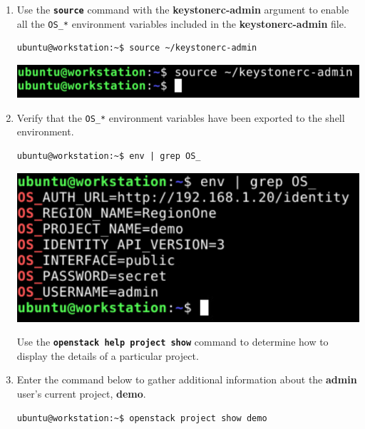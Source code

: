\documentclass[letterpaper, 12pt]{article}
\begin{document}
\begin{enumerate}
    \item Use the \textbf{\texttt{source}} command with the \textbf{keystonerc-admin} argument to enable all the
    \texttt{OS\_*} environment variables included in the \textbf{keystonerc-admin} file.
\begin{lstlisting}
ubuntu@workstation:~$ source ~/keystonerc-admin
\end{lstlisting}

    \begin{center}
        \includegraphics[width=\linewidth]{images/part2/step3.png}
    \end{center}

    \item Verify that the \texttt{OS\_*} environment variables have been exported to the shell environment.
\begin{lstlisting}
ubuntu@workstation:~$ env | grep OS_
\end{lstlisting}

    \begin{center}
        \includegraphics[width=\linewidth]{images/part2/step4.png}
    \end{center}

    \begin{tipbox}
        Use the \textbf{\texttt{openstack help project show}} command to determine how to display the details of a
        particular project.
    \end{tipbox}

    \item Enter the command below to gather additional information about the \textbf{admin} user's current project,
    \textbf{demo}.
\begin{lstlisting}
ubuntu@workstation:~$ openstack project show demo
\end{lstlisting}


\end{enumerate}
\end{document}
